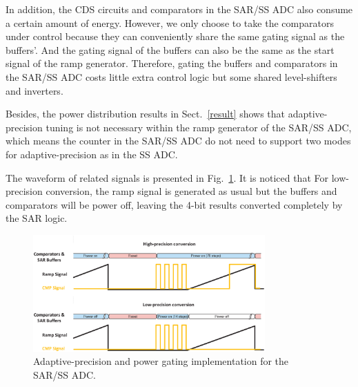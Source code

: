 In addition, the CDS circuits and comparators in the SAR/SS ADC also consume a certain amount of energy. However, we only choose to take the comparators under control because they can conveniently share the same gating signal as the buffers'. And the gating signal of the buffers can also be the same as the start signal of the ramp generator. Therefore, gating the buffers and comparators in the SAR/SS ADC costs little extra control logic but some shared level-shifters and inverters.

Besides, the power distribution results in Sect.~\ref{result} shows that adaptive-precision tuning is not necessary within the ramp generator of the SAR/SS ADC, which means the counter in the SAR/SS ADC do not need to support two modes for adaptive-precision as in the SS ADC.

The waveform of related signals is presented in Fig.~\ref{SAR_pg}. It is noticed that For low-precision conversion, the ramp signal is generated as usual but the buffers and comparators will be power off, leaving the 4-bit results converted completely by the SAR logic. 

\begin{figure}[htbp]
	\centerline{\includegraphics[width=3.5in]{./Figures/SAR_pg.eps}}
	\caption{Adaptive-precision and power gating implementation for the SAR/SS ADC.}
	\label{SAR_pg}
\end{figure} 
